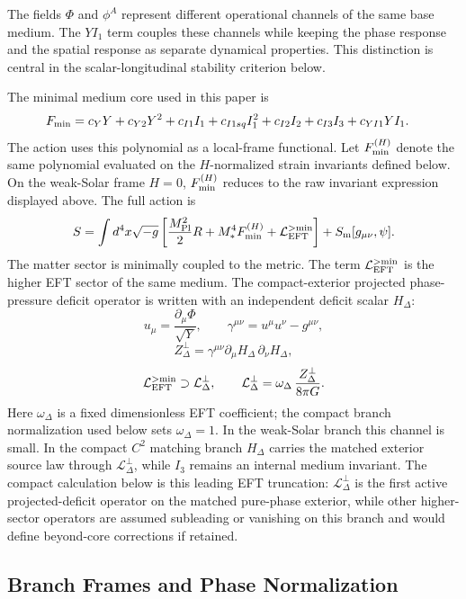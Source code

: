 \documentclass[12pt,a4paper]{article}
\begin{document}
The fields $\Phi$ and $\phi^A$ represent different operational channels of the same base medium. The $YI_1$ term couples these channels while keeping the phase response and the spatial response as separate dynamical properties. This distinction is central in the scalar-longitudinal stability criterion below.

The minimal medium core used in this paper is
\begin{align*}
F_{\rm min}={}&
c_Y Y+c_{Y2}Y^2+c_{I1}I_1+c_{I1sq}I_1^2+c_{I2}I_2+c_{I3}I_3
+c_{YI1}YI_1.
\end{align*}
The action uses this polynomial as a local-frame functional.  Let
$F_{\rm min}^{(H)}$ denote the same polynomial evaluated on the
$H$-normalized strain invariants defined below.  On the weak-Solar frame
$H=0$, $F_{\rm min}^{(H)}$ reduces to the raw invariant expression displayed
above.
The full action is
\begin{align*}
S=\int d^4x\sqrt{-g}\left[
\frac{M_{\rm Pl}^2}{2}R+M_*^4 F_{\rm min}^{(H)}
+\mathcal L_{\rm EFT}^{>{\rm min}}
\right]+S_{\rm m}[g_{\mu\nu},\psi].
\end{align*}
The matter sector is minimally coupled to the metric. The term
$\mathcal L_{\rm EFT}^{>{\rm min}}$ is the higher EFT sector of the same
medium. The compact-exterior projected phase-pressure deficit operator is
written with an independent deficit scalar $H_\Delta$:
\[
u_\mu=\frac{\partial_\mu\Phi}{\sqrt Y},\qquad
\gamma^{\mu\nu}=u^\mu u^\nu-g^{\mu\nu},
\]
\[
Z_\Delta^\perp=
\gamma^{\mu\nu}\partial_\mu H_\Delta\,\partial_\nu H_\Delta,
\]
\[
\mathcal L_{\rm EFT}^{>{\rm min}}\supset
\mathcal L_\Delta^\perp,\qquad
\mathcal L_\Delta^\perp=
\omega_\Delta\,\frac{Z_\Delta^\perp}{8\pi G}.
\]
Here $\omega_\Delta$ is a fixed dimensionless EFT coefficient; the compact
branch normalization used below sets $\omega_\Delta=1$. In the weak-Solar
branch this channel is small. In the compact $C^2$ matching branch
$H_\Delta$ carries the matched exterior source law through
$\mathcal L_\Delta^\perp$, while $I_3$ remains an internal medium invariant.
The compact calculation below is this leading EFT truncation:
$\mathcal L_\Delta^\perp$ is the first active projected-deficit operator on the
matched pure-phase exterior, while other higher-sector operators are assumed
subleading or vanishing on this branch and would define beyond-core corrections
if retained.

\subsection{Branch Frames and Phase Normalization}
\end{document}
